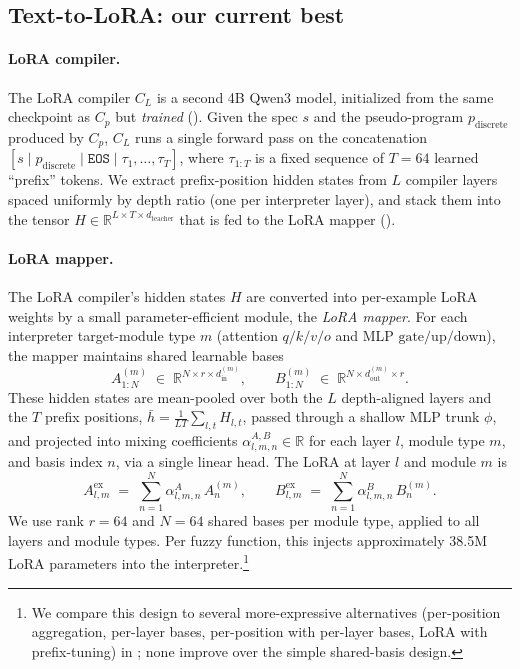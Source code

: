 \documentclass{article}
\theoremstyle{plain}
\theoremstyle{definition}
\theoremstyle{remark}
\begin{document}
\subsection{Text-to-LoRA: our current best}
\label{sec:arch_lora}

\paragraph{LoRA compiler.}
The LoRA compiler $C_L$ is a second 4B Qwen3 model, initialized from the same checkpoint as $C_p$ but \emph{trained} (). Given the spec $s$ and the pseudo-program $p_{\text{discrete}}$ produced by $C_p$, $C_L$ runs a single forward pass on the concatenation $[s \mid p_{\text{discrete}} \mid \texttt{EOS} \mid \tau_1, \dots, \tau_T]$, where $\tau_{1{:}T}$ is a fixed sequence of $T = 64$ learned ``prefix'' tokens. We extract prefix-position hidden states from $L$ compiler layers spaced uniformly by depth ratio (one per interpreter layer), and stack them into the tensor $H \in \mathbb{R}^{L \times T \times d_{\text{teacher}}}$ that is fed to the LoRA mapper ().

\paragraph{LoRA mapper.}
The LoRA compiler's hidden states $H$ are converted into per-example LoRA weights by a small parameter-efficient module, the \emph{LoRA mapper}. For each interpreter target-module type $m$ (attention $q\!/\!k\!/\!v\!/\!o$ and MLP $\text{gate}/\text{up}/\text{down}$), the mapper maintains shared learnable bases
\[
A^{(m)}_{1{:}N} \;\in\; \mathbb{R}^{N \times r \times d_{\text{in}}^{(m)}},
\qquad
B^{(m)}_{1{:}N} \;\in\; \mathbb{R}^{N \times d_{\text{out}}^{(m)} \times r}.
\]
These hidden states are mean-pooled over both the $L$ depth-aligned layers and the $T$ prefix positions, $\bar{h} = \tfrac{1}{LT}\sum_{l, t} H_{l, t}$, passed through a shallow MLP trunk $\phi$, and projected into mixing coefficients $\alpha^{A,B}_{l,m,n} \in \mathbb{R}$ for each layer $l$, module type $m$, and basis index $n$, via a single linear head. The LoRA at layer $l$ and module $m$ is
\begin{equation}
\label{eq:lora_mixing}
A^{\text{ex}}_{l, m} \;=\; \sum_{n=1}^{N} \alpha^{A}_{l, m, n} \, A^{(m)}_n,
\qquad
B^{\text{ex}}_{l, m} \;=\; \sum_{n=1}^{N} \alpha^{B}_{l, m, n} \, B^{(m)}_n.
\end{equation}
We use rank $r = 64$ and $N = 64$ shared bases per module type, applied to all layers and module types. Per fuzzy function, this injects approximately 38.5M LoRA parameters into the interpreter.\footnote{We compare this design to several more-expressive alternatives (per-position aggregation, per-layer bases, per-position with per-layer bases, LoRA with prefix-tuning) in ; none improve over the simple shared-basis design.}
\end{document}
